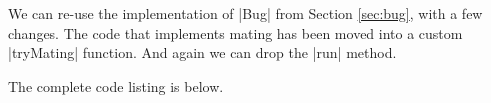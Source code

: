 We can re-use the implementation of |Bug| from Section \ref{sec:bug},
with a few changes.
The code that implements mating has been moved into a custom
|tryMating| function.
And again we can drop the |run| method.

The complete code listing is below.

